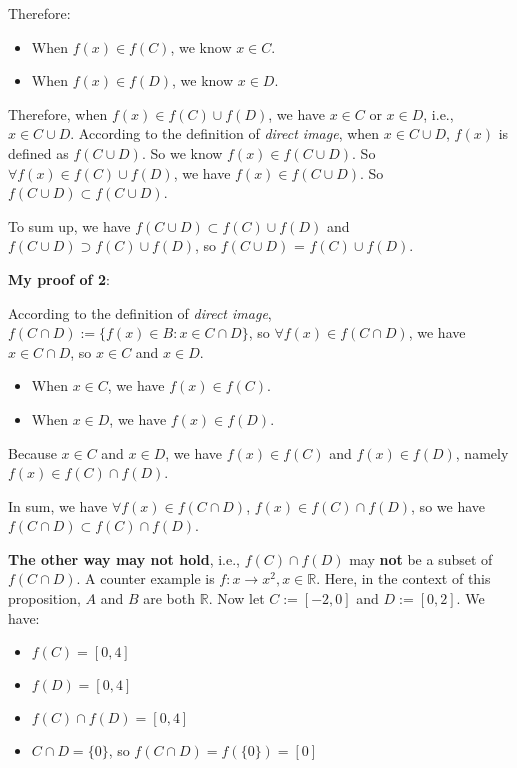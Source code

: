 \documentclass[12pt, letterpaper, oneside]{book}
\begin{document}
Therefore:
\begin{itemize}
  \item When $f(x) \in f(C)$, we know $x \in C$.
  \item When $f(x) \in f(D)$, we know $x \in D$.
\end{itemize}

Therefore, when $f(x) \in f(C) \cup f(D)$, we have $x \in C$ or $x \in D$, i.e.,
$x \in C \cup D$. According to the definition of \textit{direct image}, when $x
\in C \cup D$, $f(x)$ is defined as $f(C \cup D)$. So we know $f(x) \in f(C
\cup D)$. So $\forall f(x) \in f(C) \cup f(D)$, we have $f(x) \in f(C \cup D)$.
So $f(C \cup D) \subset f(C \cup D)$.

To sum up, we have $f(C \cup D) \subset f(C) \cup f(D)$ and $f(C \cup D)
\supset f(C) \cup f(D)$, so $f(C \cup D)$ = $f(C) \cup f(D)$.

\textbf{My proof of 2}:

According to the definition of \textit{direct image}, $f(C \cap D) := \{f(x)
\in B: x \in C \cap D\}$, so $\forall f(x) \in f(C \cap D)$, we have $x \in C
\cap D$, so $x \in C$ and $x \in D$.

\begin{itemize}
  \item When $x \in C$, we have $f(x) \in f(C)$.
  \item When $x \in D$, we have $f(x) \in f(D)$.
\end{itemize}

Because $x \in C$ and $x \in D$, we have $f(x) \in f(C)$ and $f(x) \in f(D)$,
namely $f(x) \in f(C) \cap f(D)$.

In sum, we have $\forall f(x) \in f(C \cap D)$, $f(x) \in f(C) \cap f(D)$, so
we have $f(C \cap D) \subset f(C) \cap f(D)$.

\textbf{The other way may not hold}, i.e., $f(C) \cap f(D)$ may \textbf{not} be
a subset of $f(C \cap D)$. A counter example is $f: x \rightarrow x^2, x \in
\mathbb{R}$. Here, in the context of this proposition, $A$ and $B$ are both
$\mathbb{R}$. Now let $C := [-2, 0]$ and $D := [0, 2]$. We have:

\begin{itemize}
  \item $f(C) = [0, 4]$
  \item $f(D) = [0, 4]$
  \item $f(C) \cap f(D) = [0, 4]$
  \item $C \cap D = \{0\}$, so $f(C \cap D) = f(\{0\}) = [0]$
\end{itemize}
\end{document}
